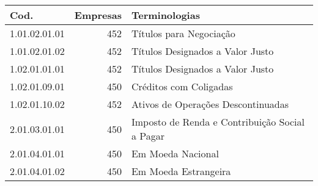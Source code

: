 \begin{table}[ht]
\centering
\begin{tabular}{lrl}
  \hline
Cod. & Empresas & Terminologias \\ 
  \hline
1.01.02.01.01 & 452 & Títulos para Negociação \\ 
  1.01.02.01.02 & 452 & Títulos Designados a Valor Justo \\ 
  1.02.01.01.01 & 452 & Títulos Designados a Valor Justo \\ 
  1.02.01.09.01 & 450 & Créditos com Coligadas \\ 
  1.02.01.10.02 & 452 & Ativos de Operações Descontinuadas \\ 
  2.01.03.01.01 & 450 & Imposto de Renda e Contribuição Social a Pagar \\ 
  2.01.04.01.01 & 450 & Em Moeda Nacional \\ 
  2.01.04.01.02 & 450 & Em Moeda Estrangeira \\ 
   \hline
\end{tabular}
\end{table}
